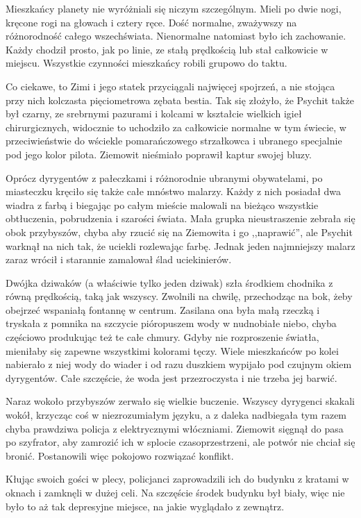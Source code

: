 Mieszkańcy planety nie wyróżniali się niczym szczególnym. Mieli po dwie nogi, kręcone rogi na głowach i cztery ręce.
Dość normalne, zważywszy na różnorodność całego wszechświata.
Nienormalne natomiast było ich zachowanie. Każdy chodził prosto, jak po linie, ze stałą prędkością lub stał całkowicie w miejscu.
Wszystkie czynności mieszkańcy robili grupowo do taktu.

Co ciekawe, to Zimi i jego statek przyciągali najwięcej spojrzeń, a nie stojąca przy nich kolczasta pięciometrowa zębata bestia.
Tak się złożyło, że Psychit także był czarny, ze srebrnymi pazurami i kolcami w kształcie wielkich igieł chirurgicznych, widocznie to uchodziło za całkowicie normalne w tym świecie, w przeciwieństwie do wściekle pomarańczowego strzałkowca i
ubranego specjalnie pod jego kolor pilota. Ziemowit nieśmiało poprawił kaptur swojej bluzy.

Oprócz dyrygentów z pałeczkami i różnorodnie ubranymi obywatelami, po miasteczku kręciło się także całe mnóstwo malarzy.
Każdy z nich posiadał dwa wiadra z farbą i biegając po całym mieście malowali na bieżąco wszystkie obtłuczenia, pobrudzenia i szarości świata.
Mała grupka nieustraszenie zebrała się obok przybyszów, chyba aby rzucić się na Ziemowita i go ,,naprawić'', ale Psychit warknął na nich tak, że uciekli rozlewając farbę.
Jednak jeden najmniejszy malarz zaraz wrócił i starannie zamalował ślad uciekinierów.

\divider{}
Dwójka dziwaków (a właściwie tylko jeden dziwak) szła środkiem chodnika z równą prędkością, taką jak wszyscy.
Zwolnili na chwilę, przechodząc na bok, żeby obejrzeć wspaniałą fontannę w centrum.
Zasilana ona była małą rzeczką i tryskała z pomnika na szczycie pióropuszem wody w nudnobiałe niebo, chyba częściowo produkując też te całe chmury.
Gdyby nie rozproszenie światła, mieniłaby się zapewne wszystkimi kolorami tęczy.
Wiele mieszkańców po kolei nabierało z niej wody do wiader i od razu duszkiem wypijało pod czujnym okiem dyrygentów.
Całe szczęście, że woda jest przezroczysta i nie trzeba jej barwić.

Naraz wokoło przybyszów zerwało się wielkie buczenie.
Wszyscy dyrygenci skakali wokół, krzycząc coś w niezrozumiałym języku, a z daleka nadbiegała tym razem chyba prawdziwa policja z elektrycznymi włóczniami.
Ziemowit sięgnął do pasa po szyfrator, aby zamrozić ich w splocie czasoprzestrzeni, ale potwór nie chciał się bronić.
Postanowili więc pokojowo rozwiązać konflikt.

Kłując swoich gości w plecy, policjanci zaprowadzili ich do budynku z kratami w oknach i zamknęli w dużej celi.
Na szczęście środek budynku był biały, więc nie było to aż tak depresyjne miejsce, na jakie wyglądało z zewnątrz.

